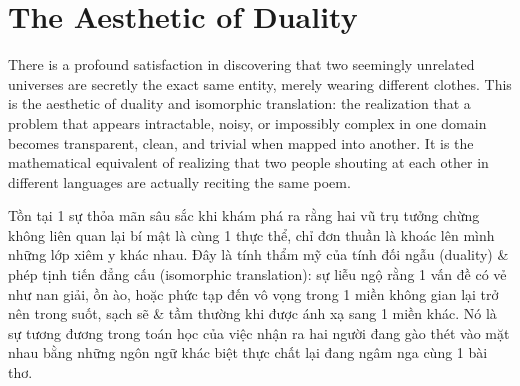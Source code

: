 \documentclass[11pt]{article}
\begin{document}
\section{The Aesthetic of Duality}
There is a profound satisfaction in discovering that two seemingly unrelated universes are secretly the exact same entity, merely wearing different clothes. This is the aesthetic of duality and isomorphic translation: the realization that a problem that appears intractable, noisy, or impossibly complex in one domain becomes transparent, clean, and trivial when mapped into another. It is the mathematical equivalent of realizing that two people shouting at each other in different languages are actually reciting the same poem.

Tồn tại 1 sự thỏa mãn sâu sắc khi khám phá ra rằng hai vũ trụ tưởng chừng không liên quan lại bí mật là cùng 1 thực thể, chỉ đơn thuần là khoác lên mình những lớp xiêm y khác nhau. Đây là tính thẩm mỹ của tính đối ngẫu (duality) \& phép tịnh tiến đẳng cấu (isomorphic translation): sự liễu ngộ rằng 1 vấn đề có vẻ như nan giải, ồn ào, hoặc phức tạp đến vô vọng trong 1 miền không gian lại trở nên trong suốt, sạch sẽ \& tầm thường khi được ánh xạ sang 1 miền khác. Nó là sự tương đương trong toán học của việc nhận ra hai người đang gào thét vào mặt nhau bằng những ngôn ngữ khác biệt thực chất lại đang ngâm nga cùng 1 bài thơ.
\end{document}

